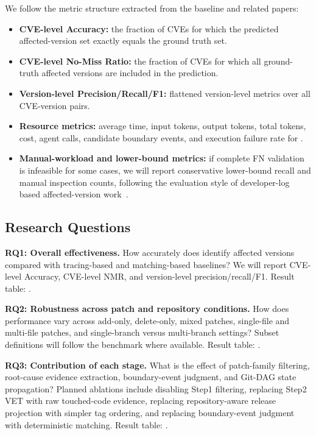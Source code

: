 We follow the metric structure extracted from the baseline and related papers:
\begin{itemize}[leftmargin=*]
  \item \textbf{CVE-level Accuracy:} the fraction of CVEs for which the predicted affected-version set exactly equals the ground truth set.
  \item \textbf{CVE-level No-Miss Ratio:} the fraction of CVEs for which all ground-truth affected versions are included in the prediction.
  \item \textbf{Version-level Precision/Recall/F1:} flattened version-level metrics over all CVE-version pairs.
\item \textbf{Resource metrics:} average time, input tokens, output tokens, total tokens, cost, agent calls, candidate boundary events, and execution failure rate for \toolname {}.
  \item \textbf{Manual-workload and lower-bound metrics:} if complete FN validation is infeasible for some cases, we will report conservative lower-bound recall and manual inspection counts, following the evaluation style of developer-log based affected-version work~\cite{tdsc2024}.
\end{itemize}


\subsection{Research Questions}

\textbf{RQ1: Overall effectiveness.} How accurately does \toolname identify affected versions compared with tracing-based and matching-based baselines? We will report CVE-level Accuracy, CVE-level NMR, and version-level precision/recall/F1. Result table: .

\textbf{RQ2: Robustness across patch and repository conditions.} How does performance vary across add-only, delete-only, mixed patches, single-file and multi-file patches, and single-branch versus multi-branch settings? Subset definitions will follow the benchmark where available. Result table: .

\textbf{RQ3: Contribution of each \toolname stage.} What is the effect of patch-family filtering, root-cause evidence extraction, boundary-event judgment, and Git-DAG state propagation? Planned ablations include disabling Step1 filtering, replacing Step2 VET with raw touched-code evidence, replacing repository-aware release projection with simpler tag ordering, and replacing boundary-event judgment with deterministic matching. Result table: .

